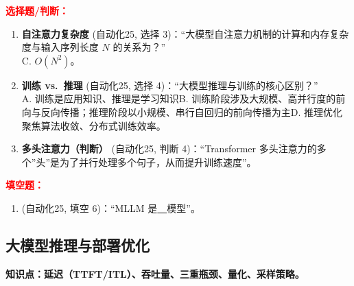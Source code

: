 ﻿\documentclass[../main.tex]{subfiles}
\begin{document}
\noindent\textbf{\textcolor{red}{选择题/判断：}}
\begin{enumerate}[itemsep=0.45em, topsep=0.2em, leftmargin=1.5em]
    \item \textbf{自注意力复杂度} \textcolor{autoclassgreen}{(自动化25, 选择 3)}：``大模型自注意力机制的计算和内存复杂度与输入序列长度 $N$ 的关系为？''\\
    \quad {}\quad C. $O(N^2)$\quad {}。 

    \item \textbf{训练 vs.\ 推理} \textcolor{autoclassgreen}{(自动化25, 选择 4)}：``大模型推理与训练的核心区别？''\\
    A. 训练是应用知识、推理是学习知识\quad B. 训练阶段涉及大规模、高并行度的前向与反向传播；推理阶段以小规模、串行自回归的前向传播为主\quad {}\quad D. 推理优化聚焦算法收敛、分布式训练效率。 

    \item \textbf{多头注意力（判断）} \textcolor{autoclassgreen}{(自动化25, 判断 4)}：``Transformer 多头注意力的多个''头''是为了并行处理多个句子，从而提升训练速度''。 
\end{enumerate}

\noindent\textbf{\textcolor{red}{填空题：}}
\begin{enumerate}[itemsep=0.3em, topsep=0.2em, leftmargin=1.5em]
    \item \textcolor{autoclassgreen}{(自动化25, 填空 6)}：``MLLM 是\underline{\ \ }模型''。 
\end{enumerate}

\subsection{大模型推理与部署优化}

\noindent\textbf{知识点：延迟（TTFT/ITL）、吞吐量、三重瓶颈、量化、采样策略。}
\end{document}
